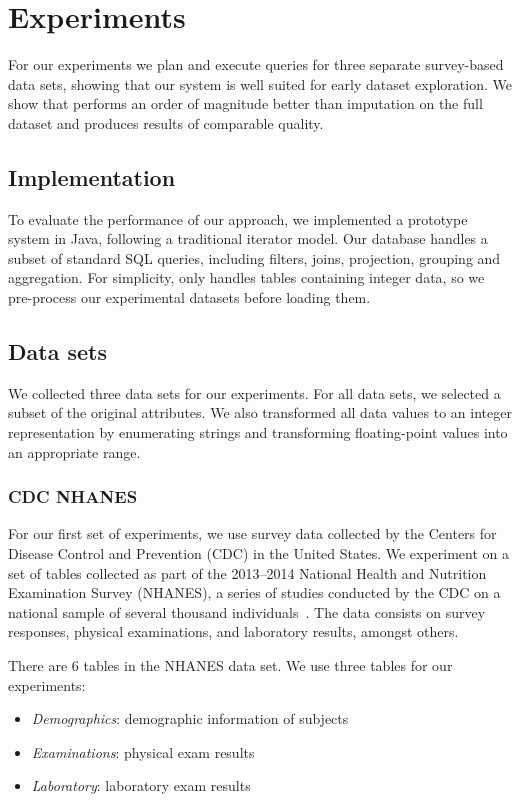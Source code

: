 \section{Experiments}\label{sec:experiments}
For our experiments we plan and execute queries for three separate survey-based data sets, showing that our system is well suited for early dataset exploration.
We show that \ProjectName{} performs an order of magnitude better than imputation on the full dataset and produces results of comparable quality.

\subsection{Implementation}
To evaluate the performance of our approach, we implemented a prototype system in Java, following a traditional iterator model.
Our database handles a subset of standard SQL queries, including filters, joins, projection, grouping and aggregation.
For simplicity, \ProjectName{} only handles tables containing integer data, so we pre-process our experimental datasets before loading them.

\subsection{Data sets}\label{subsec:datasets}
We collected three data sets for our experiments.
For all data sets, we selected a subset of the original attributes.
We also transformed all data values to an integer representation by enumerating strings and transforming floating-point values into an appropriate range.

\subsubsection{CDC NHANES}
For our first set of experiments, we use survey data collected by the 
Centers for Disease Control and Prevention (CDC) in the United States. We
experiment on a set of tables collected as part of the 2013--2014 National
Health and Nutrition Examination Survey (NHANES), a series of studies
conducted by the CDC on a national sample of several thousand individuals~\cite{cdc-data}.
The data consists on survey responses, physical examinations, and laboratory
results, amongst others.

There are 6 tables in the NHANES data set. We use three tables for our experiments:

\begin{itemize}
	\item \emph{Demographics}: demographic information of subjects
	\item \emph{Examinations}: physical exam results
	\item \emph{Laboratory}: laboratory exam results
\end{itemize}

